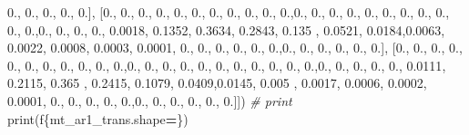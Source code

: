 \documentclass[
]{book}
\newenvironment{Shaded}{\begin{snugshade}}{\end{snugshade}}
\newcommand{\BuiltInTok}[1]{#1}
\newcommand{\CommentTok}[1]{\textcolor[rgb]{0.56,0.35,0.01}{\textit{#1}}}
\newcommand{\FloatTok}[1]{\textcolor[rgb]{0.00,0.00,0.81}{#1}}
\newcommand{\NormalTok}[1]{#1}
\newcommand{\OperatorTok}[1]{\textcolor[rgb]{0.81,0.36,0.00}{\textbf{#1}}}
\newcommand{\SpecialCharTok}[1]{\textcolor[rgb]{0.00,0.00,0.00}{#1}}
\newcommand{\SpecialStringTok}[1]{\textcolor[rgb]{0.31,0.60,0.02}{#1}}
\begin{document}
\begin{Shaded}
\begin{Highlighting}[]
\FloatTok{0.}\NormalTok{, }\FloatTok{0.}\NormalTok{, }\FloatTok{0.}\NormalTok{, }\FloatTok{0.}\NormalTok{, }\FloatTok{0.}\NormalTok{], [}\FloatTok{0.}\NormalTok{, }\FloatTok{0.}\NormalTok{, }\FloatTok{0.}\NormalTok{, }\FloatTok{0.}\NormalTok{, }\FloatTok{0.}\NormalTok{, }\FloatTok{0.}\NormalTok{, }\FloatTok{0.}\NormalTok{, }\FloatTok{0.}\NormalTok{, }\FloatTok{0.}\NormalTok{, }\FloatTok{0.}\NormalTok{, }\FloatTok{0.}\NormalTok{,}\FloatTok{0.}\NormalTok{, }\FloatTok{0.}\NormalTok{, }\FloatTok{0.}\NormalTok{, }\FloatTok{0.}\NormalTok{,}
\FloatTok{0.}\NormalTok{, }\FloatTok{0.}\NormalTok{, }\FloatTok{0.}\NormalTok{, }\FloatTok{0.}\NormalTok{, }\FloatTok{0.}\NormalTok{, }\FloatTok{0.}\NormalTok{, }\FloatTok{0.}\NormalTok{,}\FloatTok{0.}\NormalTok{, }\FloatTok{0.}\NormalTok{, }\FloatTok{0.}\NormalTok{, }\FloatTok{0.}\NormalTok{, }\FloatTok{0.0018}\NormalTok{, }\FloatTok{0.1352}\NormalTok{, }\FloatTok{0.3634}\NormalTok{, }\FloatTok{0.2843}\NormalTok{, }\FloatTok{0.135}
\NormalTok{, }\FloatTok{0.0521}\NormalTok{, }\FloatTok{0.0184}\NormalTok{,}\FloatTok{0.0063}\NormalTok{, }\FloatTok{0.0022}\NormalTok{, }\FloatTok{0.0008}\NormalTok{, }\FloatTok{0.0003}\NormalTok{, }\FloatTok{0.0001}\NormalTok{, }\FloatTok{0.}\NormalTok{, }\FloatTok{0.}\NormalTok{, }\FloatTok{0.}\NormalTok{, }\FloatTok{0.}\NormalTok{, }\FloatTok{0.}\NormalTok{,}
\FloatTok{0.}\NormalTok{,}\FloatTok{0.}\NormalTok{, }\FloatTok{0.}\NormalTok{, }\FloatTok{0.}\NormalTok{, }\FloatTok{0.}\NormalTok{, }\FloatTok{0.}\NormalTok{, }\FloatTok{0.}\NormalTok{], [}\FloatTok{0.}\NormalTok{, }\FloatTok{0.}\NormalTok{, }\FloatTok{0.}\NormalTok{, }\FloatTok{0.}\NormalTok{, }\FloatTok{0.}\NormalTok{, }\FloatTok{0.}\NormalTok{, }\FloatTok{0.}\NormalTok{, }\FloatTok{0.}\NormalTok{, }\FloatTok{0.}\NormalTok{, }\FloatTok{0.}\NormalTok{, }\FloatTok{0.}\NormalTok{,}\FloatTok{0.}\NormalTok{, }\FloatTok{0.}\NormalTok{,}
\FloatTok{0.}\NormalTok{, }\FloatTok{0.}\NormalTok{, }\FloatTok{0.}\NormalTok{, }\FloatTok{0.}\NormalTok{, }\FloatTok{0.}\NormalTok{, }\FloatTok{0.}\NormalTok{, }\FloatTok{0.}\NormalTok{, }\FloatTok{0.}\NormalTok{, }\FloatTok{0.}\NormalTok{,}\FloatTok{0.}\NormalTok{, }\FloatTok{0.}\NormalTok{, }\FloatTok{0.}\NormalTok{, }\FloatTok{0.}\NormalTok{, }\FloatTok{0.}\NormalTok{, }\FloatTok{0.0111}\NormalTok{, }\FloatTok{0.2115}\NormalTok{, }\FloatTok{0.365}\NormalTok{ ,}
\FloatTok{0.2415}\NormalTok{, }\FloatTok{0.1079}\NormalTok{, }\FloatTok{0.0409}\NormalTok{,}\FloatTok{0.0145}\NormalTok{, }\FloatTok{0.005}\NormalTok{ , }\FloatTok{0.0017}\NormalTok{, }\FloatTok{0.0006}\NormalTok{, }\FloatTok{0.0002}\NormalTok{, }\FloatTok{0.0001}\NormalTok{, }\FloatTok{0.}\NormalTok{, }\FloatTok{0.}\NormalTok{,}
\FloatTok{0.}\NormalTok{, }\FloatTok{0.}\NormalTok{, }\FloatTok{0.}\NormalTok{,}\FloatTok{0.}\NormalTok{, }\FloatTok{0.}\NormalTok{, }\FloatTok{0.}\NormalTok{, }\FloatTok{0.}\NormalTok{, }\FloatTok{0.}\NormalTok{, }\FloatTok{0.}\NormalTok{]])}
\CommentTok{\# print}
\BuiltInTok{print}\NormalTok{(}\SpecialStringTok{f\textquotesingle{}}\SpecialCharTok{\{}\NormalTok{mt\_ar1\_trans}\SpecialCharTok{.}\NormalTok{shape}\OperatorTok{=}\SpecialCharTok{\}}\SpecialStringTok{\textquotesingle{}}\NormalTok{)}
\end{Highlighting}
\end{Shaded}
\end{document}
